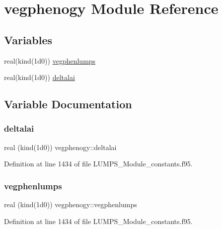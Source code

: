 \hypertarget{namespacevegphenogy}{}\section{vegphenogy Module Reference}
\label{namespacevegphenogy}
\subsection*{Variables}
\begin{DoxyCompactItemize}
\item 
real(kind(1d0)) \hyperlink{namespacevegphenogy_a05592f6d02152feabac40f31a5c9fd61}{vegphenlumps}
\item 
real(kind(1d0)) \hyperlink{namespacevegphenogy_a4eb57eeebce5733b3d0392c0de2d5c73}{deltalai}
\end{DoxyCompactItemize}


\subsection{Variable Documentation}
\mbox{\label{namespacevegphenogy_a4eb57eeebce5733b3d0392c0de2d5c73}} 
\subsubsection{\texorpdfstring{deltalai}{deltalai}}
{\footnotesize\ttfamily real (kind(1d0)) vegphenogy\+::deltalai}



Definition at line 1434 of file L\+U\+M\+P\+S\+\_\+\+Module\+\_\+constants.\+f95.

\mbox{\label{namespacevegphenogy_a05592f6d02152feabac40f31a5c9fd61}} 
\subsubsection{\texorpdfstring{vegphenlumps}{vegphenlumps}}
{\footnotesize\ttfamily real (kind(1d0)) vegphenogy\+::vegphenlumps}



Definition at line 1434 of file L\+U\+M\+P\+S\+\_\+\+Module\+\_\+constants.\+f95.

